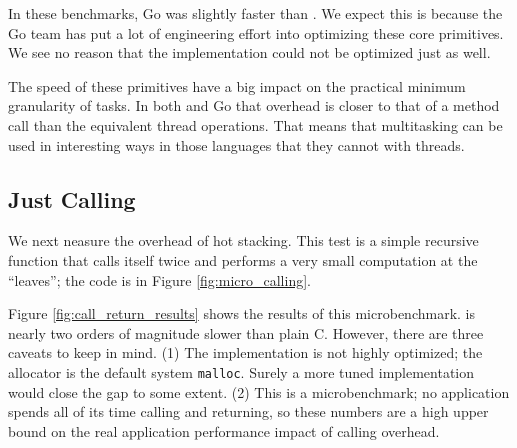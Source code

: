 \documentclass[acmsmall,anonymous,review]{acmart}\settopmatter{printfolios=true,printccs=false,printacmref=false}
\begin{document}
In these benchmarks, Go was slightly faster than \charcoal{}.
We expect this is because the Go team has put a lot of engineering effort into optimizing these core primitives.
We see no reason that the \charcoal{} implementation could not be optimized just as well.

The speed of these primitives have a big impact on the practical minimum granularity of tasks.
In both \charcoal{} and Go that overhead is closer to that of a method call than the equivalent thread operations.
That means that multitasking can be used in interesting ways in those languages that they cannot with threads.

\subsection{Just Calling}

We next neasure the overhead of hot stacking.
This test is a simple recursive function that calls itself twice and performs a very small computation at the ``leaves''; the code is in Figure \ref{fig:micro_calling}.

Figure \ref{fig:call_return_results} shows the results of this microbenchmark.
\charcoal{} is nearly two orders of magnitude slower than plain C.
However, there are three caveats to keep in mind.
(1) The \charcoal{} implementation is not highly optimized; the allocator is the default system \texttt{malloc}.
Surely a more tuned implementation would close the gap to some extent.
(2) This is a microbenchmark; no application spends all of its time calling and returning, so these numbers are a high upper bound on the real application performance impact of calling overhead.
\end{document}
